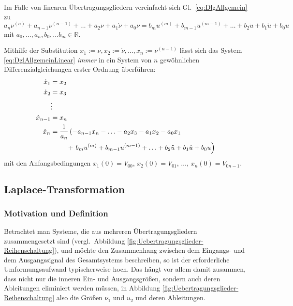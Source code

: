 Im Falle von linearen Übertragungsgliedern vereinfacht sich Gl.~\eqref{eq:DlgAllgemein} zu
\begin{equation} \label{eq:DglAllgemeinLinear}
  a_n \nu^{(n)} + a_{n-1} \nu^{(n-1)} + \ldots + a_2 \ddot \nu + a_1 \dot \nu + a_0 \nu =  b_m u^{(m)} + b_{m-1} u^{(m-1)} + \ldots + b_2 \ddot u + b_1 \dot u + b_0 u
\end{equation}
mit $a_0, \ldots, a_n, b_0, \ldots b_m \in \mathbb{R}$.

Mithilfe der Substitution $x_1 := \nu, x_2 := \dot \nu, \ldots, x_{n} := \nu^{(n-1)}$ lässt sich das System \eqref{eq:DglAllgemeinLinear} \emph{immer} in ein System von $n$ gewöhnlichen Differenzialgleichungen erster Ordnung überführen:
\begin{align}\label{eq:DglSysAllgemein}
  \begin{split}
    \dot x_1 &= x_2 \\
    \dot x_2 &= x_3 \\
            &\vdots \\
    \dot x_{n-1} &= x_n\\
    \dot x_n &= \frac{1}{a_n}\left(-a_{n-1} x_n - \ldots - a_2 x_3 - a_1 x_2 - a_0 x_1 \right.\\ &\hphantom{= \frac{1}{a_n}} + \left.  b_m u^{(m)} + b_{m-1} u^{(m-1)} + \ldots + b_2 \ddot u + b_1 \dot u + b_0 u\right)
  \end{split}
\end{align}
mit den Anfangsbedingungen $x_1(0) = V_{00}$, $x_2(0)=V_{01}$, $\ldots$, $x_n(0) =V_{0n-1}$.



\subsection{Laplace-Transformation}\label{sec:lapl-transf}

\subsubsection{Motivation und Definition} \label{sec:motiv-und-defin}
Betrachtet man Systeme, die aus mehreren Übertragungsgliedern zusammengesetzt sind (vergl.~Abbildung \ref{fig:Uebertragungsglieder-Reihenschaltung}), und möchte den Zusammenhang zwischen dem Eingangs- und dem Ausgangssignal des Gesamtsystems beschreiben, so ist der erforderliche Umformungsaufwand typischerweise hoch. Das hängt vor allem damit zusammen, dass nicht nur die inneren Ein- und Ausgangsgrößen, sondern auch deren Ableitungen eliminiert werden müssen, in Abbildung \ref{fig:Uebertragungsglieder-Reihenschaltung} also die Größen $\nu_1$ und $u_2$ und deren Ableitungen.



